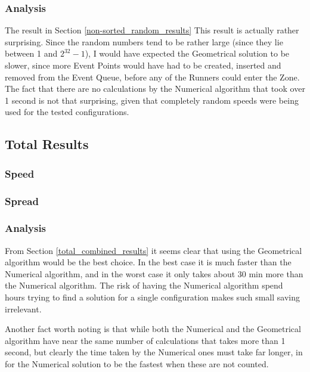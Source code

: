 \subsubsection*{Analysis}
The result in Section \ref{non-sorted_random_results} This result is actually rather surprising. Since the random numbers tend to be rather large (since they lie between 1 and $2^{32} - 1$), I would have expected the Geometrical solution to be slower, since more Event Points would have had to be created, inserted and removed from the Event Queue, before any of the Runners could enter the Zone. The fact that there are no calculations by the Numerical algorithm that took over 1 second is not that surprising, given that completely random speeds were being used for the tested configurations.\\



\subsection{Total Results}
\subsubsection*{Speed}
\FloatBarrier


\label{total_combined_results} 

\FloatBarrier
\subsubsection*{Spread}
\FloatBarrier



\FloatBarrier
\subsubsection*{Analysis}
From Section \ref{total_combined_results} it seems clear that using the Geometrical algorithm would be the best choice. In the best case it is much faster than the Numerical algorithm, and in the worst case it only takes about 30 min more than the Numerical algorithm. The risk of having the Numerical algorithm spend hours trying to find a solution for a single configuration makes such small saving irrelevant.  

Another fact worth noting is that while both the Numerical and the Geometrical algorithm have near the same number of calculations that takes more than 1 second, but clearly the time taken by the Numerical ones must take far longer, in for the Numerical solution to be the fastest when these are not counted.

